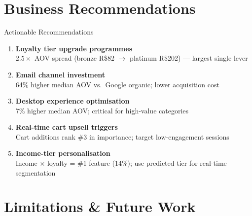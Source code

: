 \documentclass[aspectratio=169,10pt]{beamer}
\begin{document}
\section{Business Recommendations}

\begin{frame}{Actionable Recommendations}
  \small
  \begin{enumerate}
    \item \textbf{Loyalty tier upgrade programmes}\\
          {\color{gray}$2.5\times$ AOV spread (bronze R\$82 $\rightarrow$
          platinum R\$202) --- largest single lever}

    \vspace{4pt}
    \item \textbf{Email channel investment}\\
          {\color{gray}64\% higher median AOV vs.\ Google organic; lower
          acquisition cost}

    \vspace{4pt}
    \item \textbf{Desktop experience optimisation}\\
          {\color{gray}7\% higher median AOV; critical for high-value
          categories}

    \vspace{4pt}
    \item \textbf{Real-time cart upsell triggers}\\
          {\color{gray}Cart additions rank \#3 in importance; target
          low-engagement sessions}

    \vspace{4pt}
    \item \textbf{Income-tier personalisation}\\
          {\color{gray}Income $\times$ loyalty = \#1 feature (14\%); use
          predicted tier for real-time segmentation}
  \end{enumerate}
\end{frame}

\section{Limitations \& Future Work}
\end{document}
